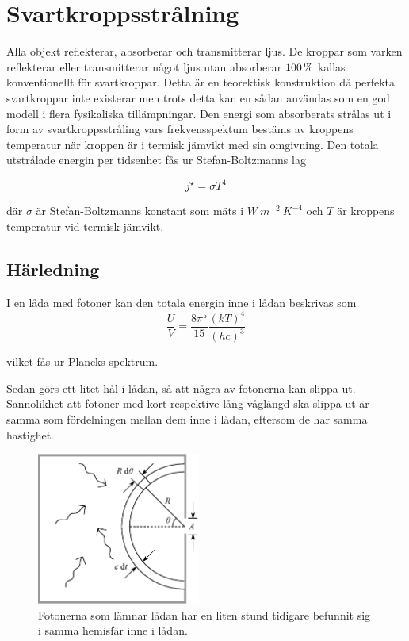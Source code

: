 \section{Svartkroppsstrålning}
\label{sec:blackbody}

Alla objekt reflekterar, absorberar och transmitterar ljus. De kroppar som varken 
reflekterar eller transmitterar något ljus utan absorberar $\unit[100]{\%}$ kallas konventionellt för 
svartkroppar. Detta är en teorektisk konstruktion då perfekta svartkroppar inte existerar 
men trots detta kan en sådan användas som en god modell i flera fysikaliska 
tillämpningar. Den energi som absorberats strålas ut i form av svartkroppsstråling vars 
frekvensspektum bestäms av kroppens temperatur när kroppen är i termisk jämvikt med
 sin omgivning. Den totala utstrålade energin per tidsenhet fås ur Stefan-Boltzmanns lag
 
\begin{equation}
\label{eq:boltzmanslag}
\boxed{ \; \; \;
j^{\star} = \sigma T^{4}
\; \; \; }
\end{equation}

\noindent
där $\sigma$ är Stefan-Boltzmanns konstant som mäts i $\unit{W~m^{-2}~K^{-4}}$ och $T$ är kroppens temperatur vid termisk jämvikt.

\subsection{Härledning}
I en låda med fotoner kan den totala energin inne i lådan beskrivas som 
\begin{equation}
\label{eq:photonbox}
\frac{U}{V}=\frac{8\pi^5}{15}\frac{(kT)^4}{(hc)^3}
\end{equation}

vilket fås ur Plancks spektrum.\cite[ss.~301-302]{schroeder00}

Sedan görs ett litet hål i lådan, så att några av fotonerna kan slippa ut. Sannolikhet att fotoner med kort respektive lång våglängd ska slippa ut är samma som fördelningen mellan dem inne i lådan, eftersom de har samma hastighet.

\begin{figure}[hpbt]
\centering
\includegraphics[height=5cm]{images/blackbody_box.eps}
\caption{\label{fig:box}{Fotonerna som lämnar lådan har en liten stund tidigare befunnit sig i samma hemisfär inne i lådan.}}
\end{figure}

